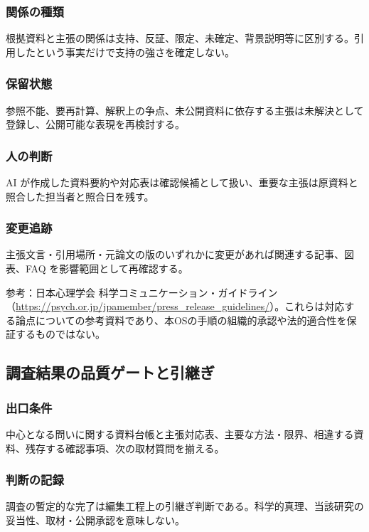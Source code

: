 \documentclass[a4paper,11pt]{article}
\begin{document}
\subsubsection{関係の種類}
\par 根拠資料と主張の関係は支持、反証、限定、未確定、背景説明等に区別する。引用したという事実だけで支持の強さを確定しない。\par\medskip
\subsubsection{保留状態}
\par 参照不能、要再計算、解釈上の争点、未公開資料に依存する主張は未解決として登録し、公開可能な表現を再検討する。\par\medskip
\subsubsection{人の判断}
\par AI が作成した資料要約や対応表は確認候補として扱い、重要な主張は原資料と照合した担当者と照合日を残す。\par\medskip
\subsubsection{変更追跡}
\par 主張文言・引用場所・元論文の版のいずれかに変更があれば関連する記事、図表、FAQ を影響範囲として再確認する。\par\medskip
\par 参考：日本心理学会 科学コミュニケーション・ガイドライン（\url{https://psych.or.jp/jpamember/press_release_guidelines/}）。これらは対応する論点についての参考資料であり、本OSの手順の組織的承認や法的適合性を保証するものではない。\par\medskip
\subsection{調査結果の品質ゲートと引継ぎ}
\subsubsection{出口条件}
\par 中心となる問いに関する資料台帳と主張対応表、主要な方法・限界、相違する資料、残存する確認事項、次の取材質問を揃える。\par\medskip
\subsubsection{判断の記録}
\par 調査の暫定的な完了は編集工程上の引継ぎ判断である。科学的真理、当該研究の妥当性、取材・公開承認を意味しない。\par\medskip
\end{document}
